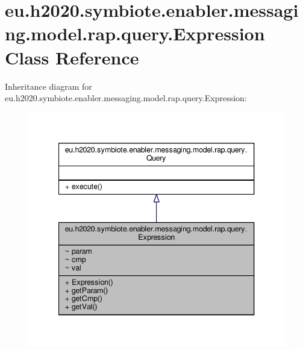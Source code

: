 \hypertarget{classeu_1_1h2020_1_1symbiote_1_1enabler_1_1messaging_1_1model_1_1rap_1_1query_1_1Expression}{}\section{eu.\+h2020.\+symbiote.\+enabler.\+messaging.\+model.\+rap.\+query.\+Expression Class Reference}
\label{classeu_1_1h2020_1_1symbiote_1_1enabler_1_1messaging_1_1model_1_1rap_1_1query_1_1Expression}


Inheritance diagram for eu.\+h2020.\+symbiote.\+enabler.\+messaging.\+model.\+rap.\+query.\+Expression\+:
\nopagebreak
\begin{figure}[H]
\begin{center}
\leavevmode
\includegraphics[width=340pt]{classeu_1_1h2020_1_1symbiote_1_1enabler_1_1messaging_1_1model_1_1rap_1_1query_1_1Expression__inherit__graph}
\end{center}
\end{figure}



